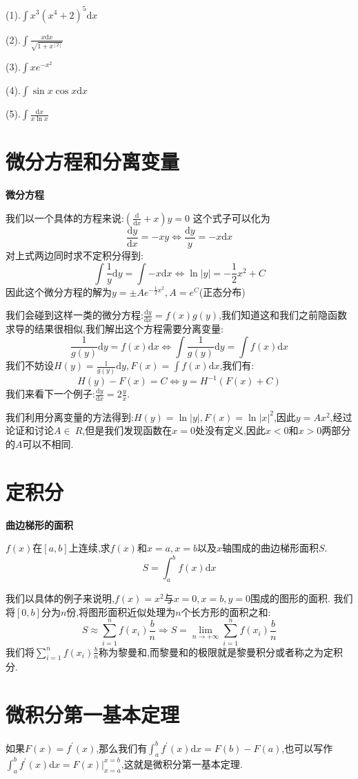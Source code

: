 \documentclass[oneside]{book}
\begin{document}
	(1).$\int x^{3}(x^{4}+2)^{5}\mathrm{d}x$
	
	(2).$\int \frac{x\mathrm{d}x}{\sqrt{1+x^[2]}}$
	
	(3).$\int xe^{-x^{2}}$
	
	(4).$\int \sin x\cos x\mathrm{d}x$
	
	(5).$\int\frac{\mathrm{d}x}{x\ln x}$
	
	\chapter{微分方程和分离变量}
	\textbf{微分方程}
	
	我们以一个具体的方程来说:$(\frac{\mathrm{d}}{\mathrm{d}x}+x)y=0$
	这个式子可以化为$$\frac{\mathrm{d}y}{\mathrm{d}x}=-xy\Leftrightarrow \frac{\mathrm{d}y}{y}=-x\mathrm{d}x$$
	对上式两边同时求不定积分得到:$$\int \frac{1}{y}\mathrm{d}y=\int -x\mathrm{d}x\Leftrightarrow \ln |y|=-\frac{1}{2}x^{2}+C$$
	因此这个微分方程的解为$y=\pm Ae^{-\frac{1}{2}x^{2}},A=e^{C}$(正态分布)
	
	我们会碰到这样一类的微分方程:$\frac{\mathrm{d}y}{\mathrm{d}x}=f(x)g(y)$,我们知道这和我们之前隐函数求导的结果很相似,我们解出这个方程需要分离变量:
	$$\frac{1}{g(y)}\mathrm{d}y=f(x)\mathrm{d}x\Leftrightarrow \int \frac{1}{g(y)}\mathrm{d}y=\int f(x)\mathrm{d}x$$
	我们不妨设$H(y)=\frac{1}{g(y)}\mathrm{d}y,F(x)=\int f(x)\mathrm{d}x$,我们有:$$H(y)-F(x)=C\Leftrightarrow y=H^{-1}(F(x)+C)$$
	我们来看下一个例子:$\frac{\mathrm{d}y}{\mathrm{d}x}=2\frac{y}{x}$.
	
	我们利用分离变量的方法得到:$H(y)=\ln |y|,F(x)=\ln |x|^{2}$,因此$y=Ax^{2}$,经过论证和讨论$A\in \ R$,但是我们发现函数在$x=0$处没有定义,因此$x<0$和$x>0$两部分的$A$可以不相同.
	
	\chapter{定积分}
	\textbf{曲边梯形的面积}
	
	$f(x)$在$[a,b]$上连续,求$f(x)$和$x=a,x=b$以及$x$轴围成的曲边梯形面积$S$.
	$$S=\int_{a}^{b}f(x)\mathrm{d}x$$
	
	我们以具体的例子来说明,$f(x)=x^{2}$与$x=0,x=b,y=0$围成的图形的面积.
	我们将$[0,b]$分为$n$份,将图形面积近似处理为$n$个长方形的面积之和:
	$$S\approx\sum_{i=1}^{n}f(x_{i})\frac{b}{n}\Rightarrow S=\lim\limits_{n\rightarrow +\infty}\sum_{i=1}^{n}f(x_{i})\frac{b}{n}$$
	我们将$\sum_{i=1}^{n}f(x_{i})\frac{b}{n}$称为黎曼和,而黎曼和的极限就是黎曼积分或者称之为定积分.
	\chapter{微积分第一基本定理}
	如果$F(x)=f^{'}(x)$,那么我们有$\int_{a}^{b} f^{'}(x)\mathrm{d}x=F(b)-F(a)$,也可以写作$\int_{a}^{b} f^{'}(x)\mathrm{d}x=F(x)|_{x=a}^{x=b}$,这就是微积分第一基本定理.
	
\end{document}
